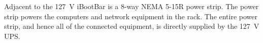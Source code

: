 %

Adjacent to the 127~V iBootBar is a 8-way NEMA 5-15R power strip. The power strip powers the computers and network equipment in the rack. The entire power strip, and hence all of the connected equipment, is directly supplied by the 127~V UPS.

